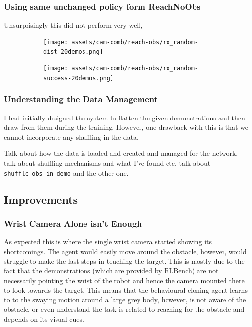 \subsubsection{Using same unchanged policy form ReachNoObs}
Unsurprisingly this did not perform very well, 
\begin{figure}[htpb] %
  \centering
  \begin{subfigure}{0.45\linewidth}
    \centering
    \texttt{[image: assets/cam-comb/reach-obs/ro\_random-dist-20demos.png]}
    \caption{}\label{subfig:ro-random-dist20}
  \end{subfigure}
  \begin{subfigure}{0.45\linewidth}
    \centering
    \texttt{[image: assets/cam-comb/reach-obs/ro\_random-success-20demos.png]}
    \caption{}\label{subfig:ro-random-success-20}
  \end{subfigure}
  \caption{}\label{fig:ro-random-cams}
\end{figure}

\subsubsection{Understanding the Data Management}
I had initially designed the system to flatten the given demonstrations and then draw from them during the training. However, one drawback with this is that we cannot incorporate any shuffling in the data. \todo

Talk about how the data is loaded and created and managed for the network, talk about shuffling mechanisms and what I've found etc. talk about \verb|shuffle_obs_in_demo| and the other one.

\subsection{Improvements}



\subsubsection{Wrist Camera Alone isn't Enough}
As expected this is where the single wrist camera started showing its shortcomings. The agent would easily move around the obstacle, however, would struggle to make the last steps in touching the target. This is mostly due to the fact that the demonstrations (which are provided by RLBench) are not necessarily pointing the wrist of the robot and hence the camera mounted there to look towards the target. This means that the behavioural cloning agent learns to to the swaying motion around a large grey body, however, is not aware of the obstacle, or even understand the task is related to reaching for the obstacle and depends on its visual cues. 

